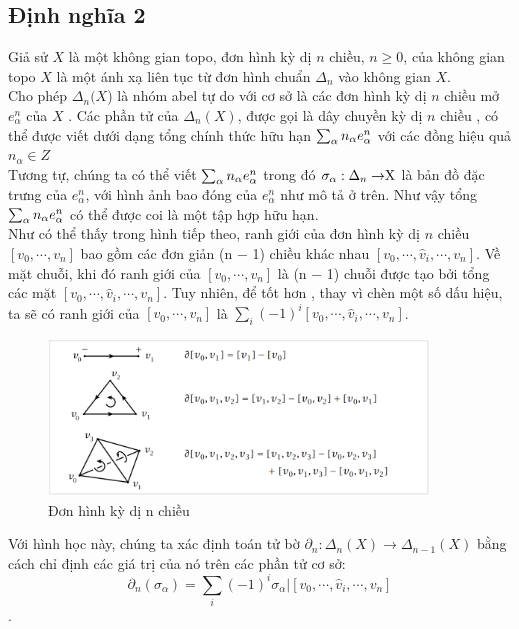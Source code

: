 \subsection[Định nghĩa 2]{Định nghĩa 2}
\indent Giả sử \(X\) là một không gian topo, đơn hình kỳ dị \(n\) chiều, \(n\geq0\), của không gian topo \(X\) là một ánh xạ liên tục từ đơn hình chuẩn \(\Delta_n\) vào không gian \(X\). \\
\indent Cho phép \(\Delta_n(X\)) là nhóm abel tự do với cơ sở là các đơn hình kỳ dị \(n\) chiều  mở \(e_\alpha^n\) của \(X\) . Các phần tử của \(\Delta_n(X)\), được gọi là dây chuyền kỳ dị \(n\) chiều , có thể được viết dưới dạng tổng chính thức hữu hạn \(\sum_{\alpha}n_\alpha$$e_\alpha^n$$\) với các đồng hiệu quả \(n_\alpha \in Z\) \\
\indent Tương tự, chúng ta có thể viết \(\sum_{\alpha}n_\alpha$$e_\alpha^n$$\)  trong đó \(\sigma_\alpha : \Delta_n\rightarrow$X$\) là bản đồ đặc trưng của \(e_\alpha^n\), với hình ảnh bao đóng của \(e_\alpha^n\) như mô tả ở trên. Như vậy tổng \(\sum_{\alpha}n_\alpha$$e_\alpha^n$$\) có thể được coi là một tập hợp hữu hạn. \\
\indent Như có thể thấy trong hình tiếp theo, ranh giới của đơn hình kỳ dị \(n\) chiều \([v_0,\cdots,v_n]\) bao gồm các đơn giản (n − 1) chiều khác nhau \([v_0,\cdots,\hat{v}_i,\cdots,v_n]\). Về mặt chuỗi, khi đó ranh giới của \([v_0,\cdots,v_n]\) là (n − 1) chuỗi được tạo bởi tổng các mặt \([v_0,\cdots, \hat{v}_i,\cdots,v_n]\). Tuy nhiên, để tốt hơn , thay vì chèn một số dấu hiệu, ta sẽ có  ranh giới của \([v_0,\cdots,v_n]\) là \(\sum_{i}(-1)^i[v_0,\cdots, \hat{v}_i,\cdots,v_n]\).\\
\begin{figure}[h]  
\includegraphics[width=0.9\textwidth]{figures/chap1_2}
\caption[Đơn hình kỳ dị n chiều]{Đơn hình kỳ dị n chiều
\label{fig:chap1_2}}
\end{figure}
\newpage
\indent Với hình học này, chúng ta xác định toán tử bờ \(\partial_n : \Delta_n(X)\rightarrow\Delta_{n-1} (X)\) bằng cách chỉ định các giá trị của nó trên các phần tử cơ sở: \[\partial_n(\sigma_\alpha) = \sum_{i}(-1)^i\sigma_\alpha|[v_0, \cdots,\hat{v}_i,\cdots,v_n]\].

